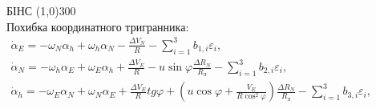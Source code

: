 \documentclass[ucs,compress]{beamer}    %
\begin{document}
\begin{frame}[plain,shrink=10]
\begin{block}{БІНС}
{\centering \line(1,0){300}\\}
Похибка координатного тригранника:\\
$\label{eq:dasdins} \begin{array}{l} 
{\dot{\alpha }_{E} =-\omega_{N} \alpha_{h} +\omega_{h} \alpha_{N} -\frac{\Delta V_{N} }{R} -\sum_{i=1}^{3}b_{1,i}\varepsilon_{i} ,} \\
{\dot{\alpha }_{N} =-\omega_{h} \alpha_{E} +\omega_{E} \alpha_{h} +\frac{\Delta V_{E} }{R} -u\sin \varphi \frac{\Delta R_{N} }{R_{\text{З}} }
-\sum_{i=1}^{3}b_{2,i}  \varepsilon_{i} ,} \\ 
{\dot{\alpha }_{h} =-\omega_{E} \alpha_{N} +\omega_{N} \alpha_{E} +\frac{\Delta V_{E} }{R} tg\varphi +(u\cos \varphi +\frac{V_{E} }{R\cos ^{2} \varphi } )
\frac{\Delta R_{N} }{R_{\text{З}} } -\sum_{i=1}^{3}b_{3,i}\varepsilon_{i} ,} \end{array} $
\end{block}
\end{frame}

\end{document}
